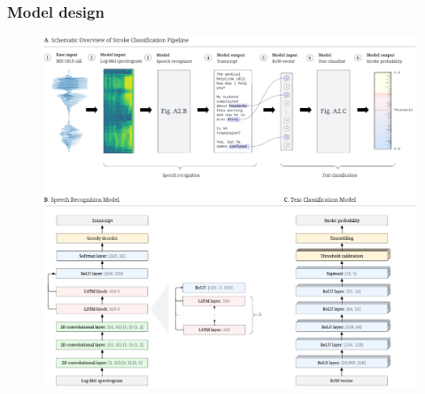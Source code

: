 \begin{frame}
    \frametitle{Model design}
    \begin{figure}
        \centering
        \includegraphics[width=0.40\paperwidth]{../graphics/paper_retrospective/model_sketch.pdf}
    \end{figure}
\end{frame}


